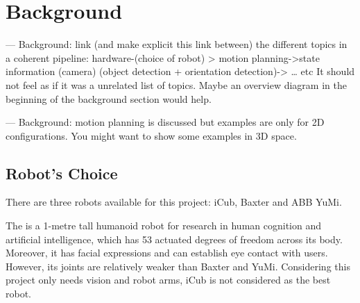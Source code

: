 \chapter{Background}

— Background: link (and make explicit this link between) the different topics in a coherent pipeline: 
hardware-(choice of robot) > motion planning->state information (camera) (object detection +  orientation detection)-> … etc
It should not feel as if it was a unrelated list of topics. Maybe an overview diagram in the beginning of the background section would help.

— Background: motion planning is discussed but examples are only for 2D configurations. You might want to show some examples in 3D space.

\section{Robot's Choice}
There are three robots available for this project: iCub, Baxter and ABB YuMi.

The \citep{iCub} is a 1-metre tall humanoid robot for research in human cognition and artificial intelligence, which has 53 actuated degrees of freedom across its body. Moreover, it has facial expressions and can establish eye contact with users. However, its joints are relatively weaker than Baxter and YuMi. Considering this project only needs vision and robot arms, iCub is not considered as the best robot.


